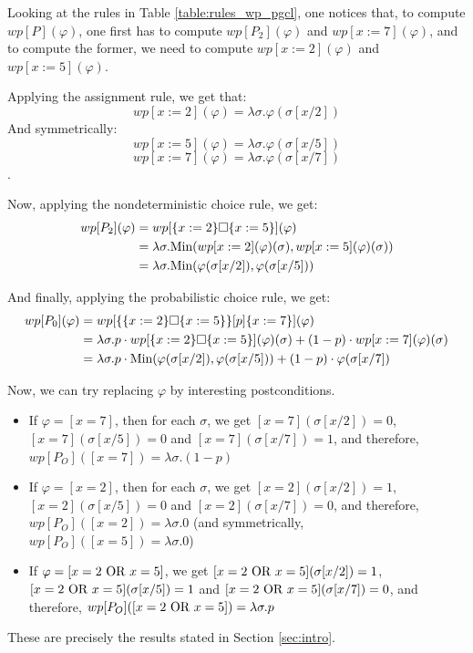 \documentclass[a4paper,10pt]{llncs}
\def\Min {\textnormal {Min}}
\begin{document}
Looking at the rules in Table \ref{table:rules_wp_pgcl}, one notices that, to compute $wp[P](\varphi)$, one first has to compute $wp[P_2](\varphi)$ and $wp[x := 7](\varphi)$, and to compute the former, we need to compute $wp[x := 2](\varphi)$ and $wp[x := 5](\varphi)$.\bigskip

Applying the assignment rule, we get that:
$$wp[x := 2](\varphi) = \lambda\sigma.\varphi(\sigma[x/2])$$
And symmetrically: 
$$wp[x := 5](\varphi) = \lambda\sigma.\varphi(\sigma[x/5])$$
$$wp[x := 7](\varphi) = \lambda\sigma.\varphi(\sigma[x/7])$$.

Now, applying the nondeterministic choice rule, we get:
\begin{align*}
wp[P_2](\varphi) &= wp[\{x := 2\} \square \{x := 5\}](\varphi) \\
&= \lambda\sigma.\Min(wp[x := 2](\varphi)(\sigma),wp[x := 5](\varphi)(\sigma)) \\
&= \lambda\sigma. \Min(\varphi(\sigma[x/2]),\varphi(\sigma[x/5]))
\end{align*}

And finally, applying the probabilistic choice rule, we get:
\begin{align*}
wp[P_0](\varphi) &= wp[\{ \{x := 2\} \square \{x := 5\} \} [p] \{ x := 7 \}](\varphi)\\
&= \lambda\sigma. p \cdot wp[\{x := 2\} \square \{x := 5\}](\varphi)(\sigma) + (1-p) \cdot wp[x := 7](\varphi)(\sigma)\\
&= \lambda\sigma. p \cdot \Min(\varphi(\sigma[x/2]),\varphi(\sigma[x/5])) + (1-p) \cdot \varphi(\sigma[x/7])
\end{align*}

Now, we can try replacing $\varphi$ by interesting postconditions.
\begin{itemize}
\item If $\varphi = [x = 7]$, then for each $\sigma$, we get $[x = 7](\sigma[x/2]) = 0$, $[x = 7](\sigma[x/5]) = 0$ and $[x = 7](\sigma[x/7]) = 1$, and therefore, $wp[P_O]([x = 7]) = \lambda\sigma. (1-p)$
\item If $\varphi = [x = 2]$, then for each $\sigma$, we get $[x = 2](\sigma[x/2]) = 1$, $[x = 2](\sigma[x/5]) = 0$ and $[x = 2](\sigma[x/7]) = 0$, and therefore, $wp[P_O]([x = 2]) = \lambda\sigma. 0$ (and symmetrically, $wp[P_O]([x = 5]) = \lambda\sigma. 0$)
\item If $\varphi = [x = 2 \textnormal{ OR } x = 5]$, we get $[x = 2 \textnormal{ OR } x = 5](\sigma[x/2]) = 1$, $[x = 2 \textnormal{ OR } x = 5](\sigma[x/5]) = 1$ and $[x = 2 \textnormal{ OR } x = 5](\sigma[x/7]) = 0$, and therefore, $wp[P_O]([x = 2 \textnormal{ OR } x = 5]) = \lambda\sigma. p$
\end{itemize}
These are precisely the results stated in Section \ref{sec:intro}.
\end{document}
